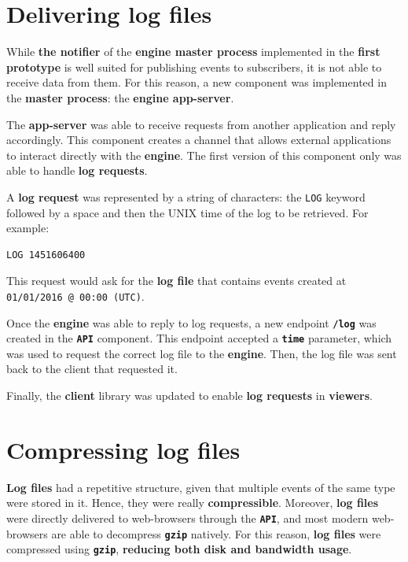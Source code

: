 \documentclass[a4paper,11pt,titlepage,abstract,numbers=noenddot,automark,mnsy,intlimits,rgb,dvipsnames]{report}
\begin{document}
\section{Delivering log files}
While \textbf{the notifier} of the \textbf{engine master process} implemented in the \textbf{first prototype} is well suited for publishing
events to subscribers, it is not able to receive data from them. For this reason, a new component was implemented in the
\textbf{master process}: the \textbf{engine app-server}.

The \textbf{app-server} was able to receive requests from another application and reply accordingly. This component creates a channel that
allows external applications to interact directly with the \textbf{engine}. The first version of this component only was able to handle
\textbf{log requests}.

A \textbf{log request} was represented by a string of characters: the \texttt{LOG} keyword followed by a space and then the UNIX time
of the log to be retrieved. For example:
\begin{verbatim}
LOG 1451606400
\end{verbatim}
This request would ask for the \textbf{log file} that contains events created at \texttt{01/01/2016 @ 00:00 (UTC)}.

Once the \textbf{engine} was able to reply to log requests, a new endpoint \textbf{\texttt{/log}} was created in the \textbf{\texttt{API}} component. This
endpoint accepted a \textbf{\texttt{time}} parameter, which was used to request the correct log file to the \textbf{engine}. Then, the log
file was sent back to the client that requested it.

Finally, the \textbf{client} library was updated to enable \textbf{log requests} in \textbf{viewers}.
\section{Compressing log files}
\textbf{Log files} had a repetitive structure, given that multiple events of the same type were stored in it. Hence, they were
really \textbf{compressible}. Moreover, \textbf{log files} were directly delivered to web-browsers through the \textbf{\texttt{API}}, and most modern
web-browsers are able to decompress \textbf{\texttt{gzip}} natively. For this reason, \textbf{log files} were compressed using \textbf{\texttt{gzip}},
\textbf{reducing both disk and bandwidth usage}.
\end{document}
